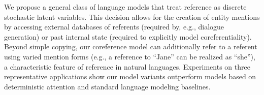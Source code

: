 We propose a general class of language models that treat reference as discrete stochastic latent variables. This decision allows for the creation of entity mentions by accessing external databases of referents (required by, e.g., dialogue generation) or past internal state (required to explicitly model coreferentiality). Beyond simple copying, our coreference model can additionally refer to a referent using varied mention forms (e.g., a reference to ``Jane'' can be realized as ``she''), a characteristic feature of reference in natural languages. Experiments on three representative applications show our model variants outperform models based on deterministic attention and standard language modeling baselines.

